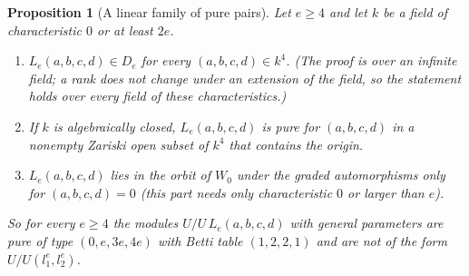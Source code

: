 \documentclass[11pt]{article}
\newtheorem{proposition}{Proposition}
\theoremstyle{definition}
\theoremstyle{remark}
\begin{document}
\begin{proposition}[A linear family of pure pairs]\label{prop:linear}
Let $e\ge4$ and let $k$ be a field of characteristic $0$ or at least $2e$.
\begin{enumerate}
\item[(i)] $L_e(a,b,c,d)\in D_e$ for every $(a,b,c,d)\in k^4$. (The proof is over an infinite field; a rank does not change under an extension of the field, so the statement holds over every field of these characteristics.)
\item[(ii)] If $k$ is algebraically closed, $L_e(a,b,c,d)$ is pure for $(a,b,c,d)$ in a nonempty Zariski open subset of $k^4$ that contains the origin.
\item[(iii)] $L_e(a,b,c,d)$ lies in the orbit of $W_0$ under the graded automorphisms only for $(a,b,c,d)=0$ (this part needs only characteristic $0$ or larger than $e$).
\end{enumerate}
So for every $e\ge4$ the modules $U/U\,L_e(a,b,c,d)$ with general parameters are pure of type $(0,e,3e,4e)$ with Betti table $(1,2,2,1)$ and are not of the form $U/U(l_1^e,l_2^e)$.
\end{proposition}
\end{document}
